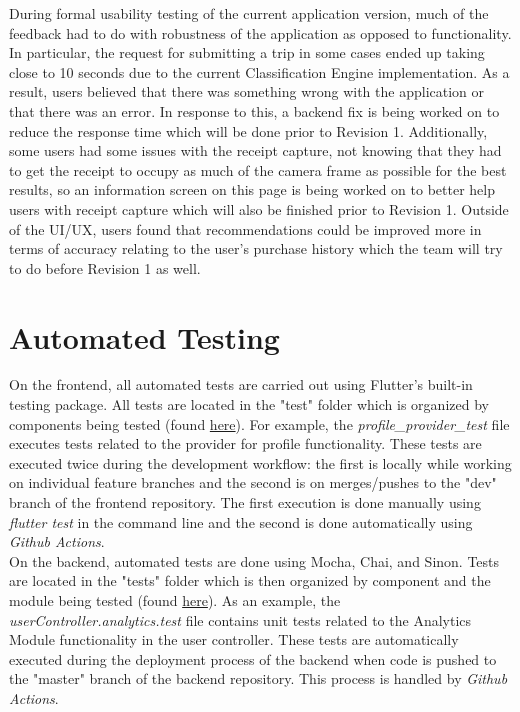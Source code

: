 \documentclass[12pt, titlepage]{article}
\begin{document}
During formal usability testing of the current application version, much of the feedback had to do with robustness
of the application as opposed to functionality. In particular, the request for submitting a trip
in some cases ended up taking close to 10 seconds due to the current Classification Engine implementation. As
a result, users believed that there was something wrong with the application or that there was an error. In response to this,
a backend fix is being worked on to reduce the response time which will be done prior to Revision 1.
Additionally, some users had some issues with the receipt capture, not knowing that they had to get the
receipt to occupy as much of the camera frame as possible for the best results, so an information screen
on this page is being worked on to better help users with receipt capture which will also be finished
prior to Revision 1. Outside of the UI/UX, users found that recommendations could be improved more
in terms of accuracy relating to the user's purchase history which the team will try to do before Revision 1
as well.

\section{Automated Testing}

On the frontend, all automated tests are carried out using Flutter's built-in testing package.
All tests are located in the "test" folder which is organized by components being tested (found 
\href{https://github.com/allanfang1/grocery_spending_tracker_app/tree/main}{here}). For example,
the \textit{profile\_provider\_test} file executes tests related to the provider for profile functionality.
These tests are executed twice during the development workflow: the first is locally while working on
individual feature branches and the second is on merges/pushes to the "dev" branch of the frontend repository.
The first execution is done manually using \textit{flutter test} in the command line and the second is done
automatically using \textit{Github Actions}.\\

On the backend, automated tests are done using Mocha, Chai, and Sinon. Tests are located in the "tests" folder which
is then organized by component and the module being tested 
(found \href{https://github.com/grocery-spending-tracker/grocery-spending-tracker-backend/tree/master/tests}{here}).
As an example, the \textit{userController.analytics.test} file contains unit tests related to the Analytics Module
functionality in the user controller.
These tests are automatically executed during the deployment process of the backend when code is pushed to the
"master" branch of the backend repository. This process is handled by \textit{Github Actions}.
\end{document}
